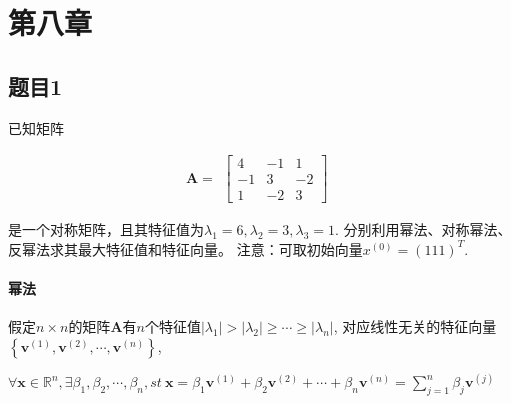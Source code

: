 \section{第八章}


\subsection{题目1}
已知矩阵

$$
\mathbf{A} = 
\begin{gathered}
\begin{bmatrix} 
4 & -1 & 1\\
-1 & 3 & -2\\
1 & -2 & 3
\end{bmatrix}
\end{gathered}
$$

是一个对称矩阵，且其特征值为$\lambda_1=6,\lambda_2=3,\lambda_3=1$.
分别利用幂法、对称幂法、反幂法求其最大特征值和特征向量。
注意：可取初始向量$x^{(0)}=(111)^{T}.$

\paragraph{幂法}
假定$n\times n$的矩阵$\mathbf{A}$有$n$个特征值$\left|\lambda_1\right|> \left|\lambda_2\right| \geq \cdots \geq \left|\lambda_n\right|$, 对应线性无关的特征向量$\left\{\mathbf{v}^{\left(1\right)}, \mathbf{v}^{\left(2\right)},\cdots,\mathbf{v}^{\left(n\right)} \right\}$,

$\forall \mathbf{x} \in \mathbb{R}^n, \exists \beta_1,\beta_2,\cdots,\beta_n, st \ \mathbf{x} = \beta_1 \mathbf{v}^{\left(1\right)} + \beta_2 \mathbf{v}^{\left(2\right)} + \cdots + \beta_n \mathbf{v}^{\left(n\right)} = \sum_{j=1}^{n} \beta_j \mathbf{v}^{\left(j\right)}$

